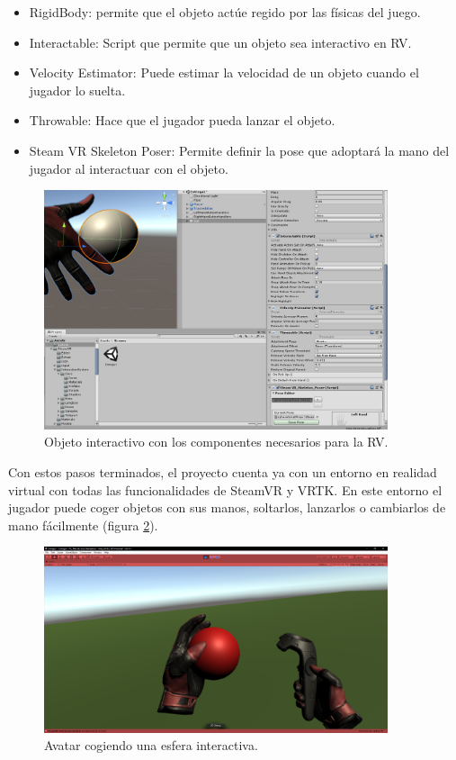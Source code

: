 \begin{itemize}
	\item{RigidBody: permite que el objeto actúe regido por las físicas del juego.}

	\item{Interactable: Script que permite que un objeto sea interactivo en RV.}
	
	\item{Velocity Estimator: Puede estimar la velocidad de un objeto cuando el jugador lo suelta.}
	
	\item{Throwable: Hace que el jugador pueda lanzar el objeto.}
	
	\item{Steam VR Skeleton Poser: Permite definir la pose que adoptará la mano del jugador al interactuar con el objeto.}

\end{itemize}

\begin{figure}
  \centering
    \includegraphics[width=0.9\textwidth]{04.Desarrollo/01.Entrega1/02.Iteracion1_2/00.Figuras/09.bola.png}
    \caption{Objeto interactivo con los componentes necesarios para la RV.}
    \label{fig:interactable}
\end{figure}

Con estos pasos terminados, el proyecto cuenta ya con un entorno en realidad virtual con todas las funcionalidades de SteamVR y VRTK. En este entorno el jugador puede coger objetos con sus manos, soltarlos, lanzarlos o cambiarlos de mano fácilmente (figura \ref{fig:esferaCogida}).


\begin{figure}
  \centering
    \includegraphics[width=0.9\textwidth]{04.Desarrollo/01.Entrega1/02.Iteracion1_2/00.Figuras/10.manos_2.png}
    \caption{Avatar cogiendo una esfera interactiva.}
    \label{fig:esferaCogida}
\end{figure}


